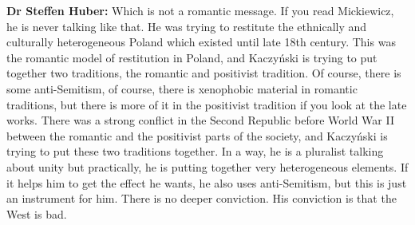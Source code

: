 \textbf{Dr Steffen Huber:} Which is not a romantic message. If you read Mickiewicz, he is never talking like that. He was trying to restitute the ethnically and culturally heterogeneous Poland which existed until late 18th century. This was the romantic model of restitution in Poland, and Kaczyński is trying to put together two traditions, the romantic and positivist tradition. Of course, there is some anti-Semitism, of course, there is xenophobic material in romantic traditions, but there is more of it in the positivist tradition if you look at the late works. There was a strong conflict in the Second Republic before World War II between the romantic and the positivist parts of the society, and Kaczyński is trying to put these two traditions together. In a way, he is a pluralist talking about unity but practically, he is putting together very heterogeneous elements. If it helps him to get the effect he wants, he also uses anti-Semitism, but this is just an instrument for him. There is no deeper conviction. His conviction is that the West is bad. 